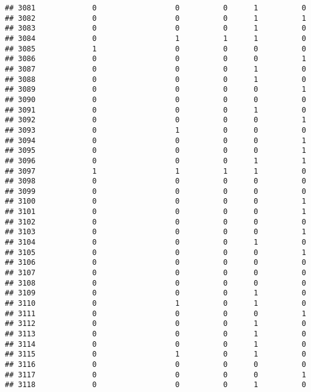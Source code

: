 \documentclass[
]{article}
\begin{document}
\begin{verbatim}
## 3081             0                  0          0      1          0
## 3082             0                  0          0      1          1
## 3083             0                  0          0      1          0
## 3084             0                  1          1      1          0
## 3085             1                  0          0      0          0
## 3086             0                  0          0      0          1
## 3087             0                  0          0      1          0
## 3088             0                  0          0      1          0
## 3089             0                  0          0      0          1
## 3090             0                  0          0      0          0
## 3091             0                  0          0      1          0
## 3092             0                  0          0      0          1
## 3093             0                  1          0      0          0
## 3094             0                  0          0      0          1
## 3095             0                  0          0      0          1
## 3096             0                  0          0      1          1
## 3097             1                  1          1      1          0
## 3098             0                  0          0      0          0
## 3099             0                  0          0      0          0
## 3100             0                  0          0      0          1
## 3101             0                  0          0      0          1
## 3102             0                  0          0      0          0
## 3103             0                  0          0      0          1
## 3104             0                  0          0      1          0
## 3105             0                  0          0      0          1
## 3106             0                  0          0      0          0
## 3107             0                  0          0      0          0
## 3108             0                  0          0      0          0
## 3109             0                  0          0      1          0
## 3110             0                  1          0      1          0
## 3111             0                  0          0      0          1
## 3112             0                  0          0      1          0
## 3113             0                  0          0      1          0
## 3114             0                  0          0      1          0
## 3115             0                  1          0      1          0
## 3116             0                  0          0      0          0
## 3117             0                  0          0      0          1
## 3118             0                  0          0      1          0

\end{verbatim}
\end{document}
